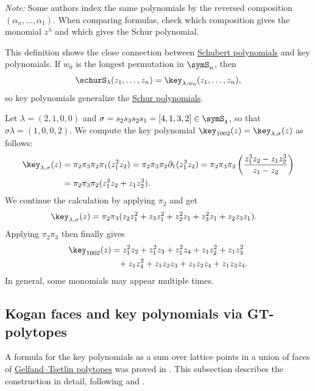 \emph{Note:} Some authors index the same polynomials by the reversed composition
$(\alpha_n,\dotsc,\alpha_1)$.  When comparing formulas, check which composition
gives the monomial $z^\lambda$ and which gives the Schur polynomial.


This definition shows the close connection between \hyperref[schubert]{Schubert polynomials}
and key polynomials.
If $w_0$ is the longest permutation in $\symS_n$, then
\[
 \schurS_\lambda(z_1,\dotsc,z_n) = \key_{\lambda,w_0}(z_1,\dotsc,z_n),
\]
so key polynomials generalize the \hyperref[schurS]{Schur polynomials}.



\begin{example}

Let $\lambda = (2,1,0,0)$ and $\sigma = s_2 s_3 s_2 s_1 = [4,1,3,2] \in \symS_4$,
so that $\sigma\lambda = (1,0,0,2)$.
We compute the key polynomial $\key_{1002}(z) = \key_{\lambda,\sigma}(z)$ as follows:
\begin{align*}
 \key_{\lambda,\sigma}(z) &= \pi_2 \pi_3 \pi_2 \pi_1 (z_1^2 z_2) =
 \pi_2 \pi_3 \pi_2 \partial_1 (z_1^3 z_2 ) = \pi_2 \pi_3 \pi_2 \left( \frac{z_1^3z_2 - z_1 z^3_2}{z_1-z_2}\right) \\
 &= \pi_2 \pi_3 \pi_2  (z_1^2z_2 + z_1 z_2^2).
\end{align*}
We continue the calculation by applying $\pi_2$ and get
\begin{align*}
\key_{\lambda,\sigma}(z) &=
 \pi_2 \pi_3 (z_2 z_1^2+z_3 z_1^2+z_2^2 z_1+z_3^2 z_1+z_2 z_3 z_1).
 \end{align*}
 Applying $\pi_2 \pi_3$ then finally gives
\begin{equation*}
\begin{split}
\key_{1002}(z) &=
z_1^2 z_2  +
z_1^2 z_3  +
z_1^2 z_4  +
z_1 z_2^2  +
z_1 z_3^2  \\
&\phantom{=}+
z_1 z_4^2  +
z_1 z_2 z_3  +
z_1 z_2 z_4  +
z_1 z_3 z_4 .
 \end{split}
\end{equation*}
In general, some monomials may appear multiple times.
\end{example}




\subsection[keyDefinitionGT]{Kogan faces and key polynomials via GT-polytopes}

A formula for the key polynomials
as a sum over lattice points in a union of faces
of \hyperref[gtpatterns]{Gelfand--Tsetlin polytopes} was proved in \cite{KiritchenkoSmirnovTimorin2010}.
This subsection describes the construction in detail,
following \cite{KiritchenkoSmirnovTimorin2010} and \cite{Kogan2000schubertgeometry}.

